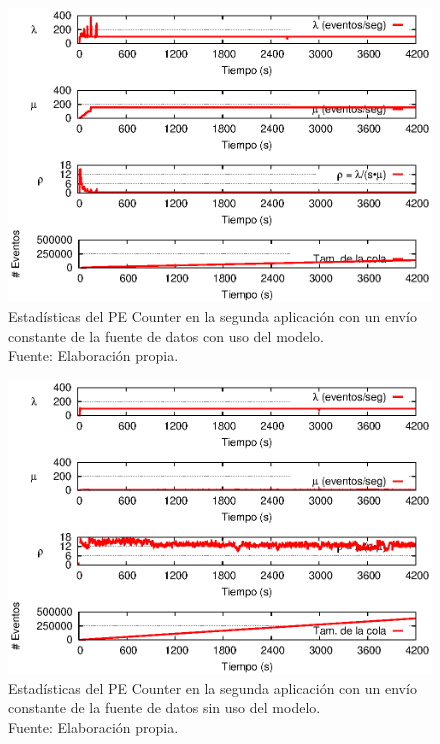 \clearpage

\begin{figure}[!ht]
    \centering
    \captionsetup{justification=centering}
    \includegraphics[scale=1]{images/exp/app2/uniform/cm/statusCounterPE.eps}
    \caption[Estadísticas del PE Counter en la segunda aplicación con un envío constante de la fuente de datos con uso del modelo.]{Estadísticas del PE Counter en la segunda aplicación con un envío constante de la fuente de datos con uso del modelo.\\Fuente: Elaboración propia.}
    \label{fig:app2-uniform-statusCounterPE-cm}
\end{figure}

\begin{figure}[!ht]
    \centering
    \captionsetup{justification=centering}
    \includegraphics[scale=1]{images/exp/app2/uniform/sm/statusCounterPE.eps}
    \caption[Estadísticas del PE Counter en la segunda aplicación con un envío constante de la fuente de datos sin uso del modelo.]{Estadísticas del PE Counter en la segunda aplicación con un envío constante de la fuente de datos sin uso del modelo.\\Fuente: Elaboración propia.}
    \label{fig:app2-uniform-statusCounterPE-sm}
\end{figure}

